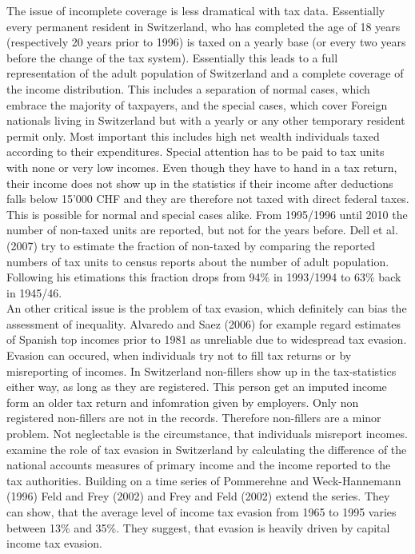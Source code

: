 \documentclass[twoside]{article}\usepackage[]{graphicx}\usepackage[]{color}
\begin{document}
\begin{multicols}{2}
The issue of incomplete coverage is less dramatical with tax data. Essentially every permanent resident in Switzerland, who has completed the age of 18 years (respectively 20 years prior to 1996) is taxed on a yearly base (or every two years before the change of the tax system). Essentially this leads to a full representation of the adult population of Switzerland and a complete coverage of the income distribution. This includes a separation of normal cases, which embrace the majority of taxpayers, and the special cases, which cover Foreign nationals living in Switzerland but with a yearly or any other temporary resident permit only. Most important this includes high net wealth individuals taxed according to their expenditures. Special attention has to be paid to tax units with none or very low incomes. Even though they have to hand in a tax return, their income does not show up in the statistics if their income after deductions falls below 15'000 CHF and they are therefore not taxed with direct federal taxes. This is possible for normal and special cases alike. From 1995/1996 until 2010 the number of non-taxed units are reported, but not for the years before. Dell et al. (2007) try to estimate the fraction of non-taxed by comparing the reported numbers of tax units to census reports about the number of adult population. Following his etimations this fraction drops from 94\% in 1993/1994 to 63\% back in 1945/46. \\

An other critical issue is the problem of tax evasion, which definitely can bias the assessment of inequality. Alvaredo and Saez (2006) for example regard estimates of Spanish top incomes prior to 1981 as unreliable due to widespread tax evasion. Evasion can occured, when individuals try not to fill tax returns or by misreporting of incomes. In Switzerland non-fillers show up in the tax-statistics either way, as long as they are registered. This person get an imputed income form an older tax return and infomration given by employers. Only non registered non-fillers are not in the records. Therefore non-fillers are a minor problem. Not neglectable is the circumstance, that individuals misreport incomes. \citet{feld_tax_2006} examine the role of tax evasion in Switzerland by calculating the difference of the national accounts measures of primary income and the income reported to the tax authorities. Building on a time series of Pommerehne and Weck-Hannemann (1996) Feld and Frey (2002) and Frey and Feld (2002) extend the series. They can show, that the average level of income tax evasion from 1965 to 1995 varies between 13\% and 35\%. They suggest, that evasion is heavily driven by capital income tax evasion. \\



\end{multicols}
\end{document}
